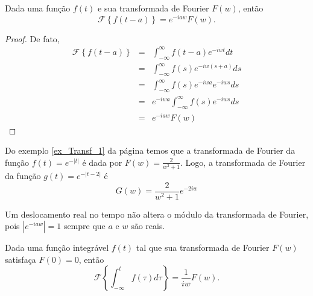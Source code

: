 \begin{teo}\label{prop_desl_t} Dada uma função $f(t)$ e sua transformada de Fourier $F(w)$, então
\begin{equation}
\mathcal{F}\left\{f(t-a)\right\}=e^{-iaw}F(w).
\end{equation}
\end{teo}
\begin{proof}
De fato,
\begin{eqnarray*}
\mathcal{F}\left\{f(t-a)\right\}&=&\int_{-\infty}^\infty  f(t-a)e^{-iwt}dt \\
&=&\int_{-\infty}^\infty  f(s)e^{-iw(s+a)}ds \\
&=&\int_{-\infty}^\infty  f(s)e^{-iwa}e^{-iws}ds \\
&=&e^{-iwa}\int_{-\infty}^\infty  f(s)e^{-iws}ds \\
&=&e^{-iaw}F(w)
\end{eqnarray*}
\end{proof}
\begin{ex}{\label{ex_desloc_tempo}} Do exemplo \ref{ex_Transf_1} da página \pageref{ex_Transf_1} temos que a transformada de Fourier da função $f(t)=e^{-|t|}$ é dada por $F(w)=\frac{2}{w^2+1}$. Logo, a transformada de Fourier da função $g(t)=e^{-|t-2|}$ é
\begin{equation}
G(w)=\frac{2}{w^2+1}e^{-2iw}
\end{equation}
\end{ex}
\begin{obs} Um deslocamento real no tempo não altera o módulo da transformada de Fourier, pois $|e^{-iaw}|=1$ sempre que $a$ e $w$ são reais.
\end{obs}
\begin{teo}\label{prop_int} Dada uma função integrável $f(t)$ tal que sua transformada de Fourier $F(w)$ satisfaça $F(0)=0$, então
\begin{equation}
\mathcal{F}\left\{\int_{-\infty}^t f(\tau)d\tau \right\}=\frac{1}{iw}F(w).
\end{equation}
\end{teo}
